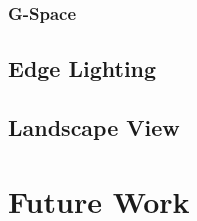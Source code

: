 \documentclass[pdf,12pt,report,strict]{SANDreport}
\begin{document}
\subsection{G-Space}
\label{sec:ParallelGraphVisualizationAlgorithms:Layout:GSpace}

\section{Edge Lighting}
\label{sec:ParallelGraphVisualizationAlgorithms:EdgeLighting}

\section{Landscape View}
\label{sec:ParallelGraphVisualizationAlgorithms:LandscapeView}


\chapter{Future Work}
\label{chap:FutureWork}








% 
\clearpage
\providecommand*{\phantomsection}{}
\phantomsection
{}


\end{document}
